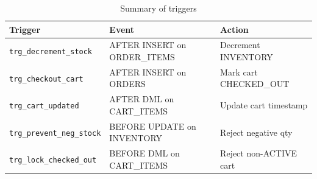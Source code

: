 \begin{table}[H]
\centering
\caption{Summary of triggers}
\begin{tabular}{lll}
\toprule
\textbf{Trigger} & \textbf{Event} & \textbf{Action} \\
\midrule
\texttt{trg\_decrement\_stock}    & AFTER INSERT on ORDER\_ITEMS & Decrement INVENTORY \\
\texttt{trg\_checkout\_cart}      & AFTER INSERT on ORDERS       & Mark cart CHECKED\_OUT \\
\texttt{trg\_cart\_updated}       & AFTER DML on CART\_ITEMS     & Update cart timestamp \\
\texttt{trg\_prevent\_neg\_stock} & BEFORE UPDATE on INVENTORY   & Reject negative qty \\
\texttt{trg\_lock\_checked\_out}  & BEFORE DML on CART\_ITEMS    & Reject non-ACTIVE cart \\
\bottomrule
\end{tabular}
\end{table}